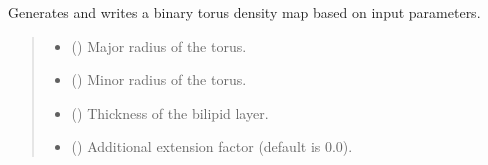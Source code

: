 \documentclass[letterpaper,10pt,english]{sphinxmanual}
\begin{document}
\begin{fulllineitems}
\begin{fulllineitems}
\label{\detokenize{src:src.BagelFitter.BagelFitter.generate_binary_torus}}
\pysigstartsignatures
{}
\pysigstopsignatures
\sphinxAtStartPar
Generates and writes a binary torus density map based on input parameters.
\begin{quote}\begin{description}
\begin{itemize}
\item {} 
\sphinxAtStartPar
{} () \textendash{} Major radius of the torus.

\item {} 
\sphinxAtStartPar
{} () \textendash{} Minor radius of the torus.

\item {} 
\sphinxAtStartPar
{} () \textendash{} Thickness of the bilipid layer.

\item {} 
\sphinxAtStartPar
{} (\sphinxstyleliteralemphasis{\sphinxupquote{, }}) \textendash{} Additional extension factor (default is 0.0).


\end{itemize}
\end{description}
\end{quote}
\end{fulllineitems}
\end{fulllineitems}
\end{document}
